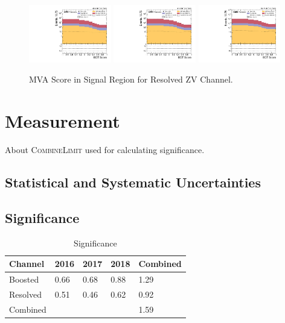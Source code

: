 \begin{figure}[!ht]
  \centering
  \includegraphics[width=0.32\textwidth]{analysis_plots/2016_zjj/sr_l/mva_score_zjj_var2_log.pdf}
  \includegraphics[width=0.32\textwidth]{analysis_plots/2017_zjj/sr_l/mva_score_zjj_var2_log.pdf}
  \includegraphics[width=0.32\textwidth]{analysis_plots/2018_zjj/sr_l/mva_score_zjj_var2_log.pdf} \\
  \caption[MVA Score in Signal Region for Resolved ZV Channel]%
  {MVA Score in Signal Region for Resolved ZV Channel.}%
  \label{fig:zjj-sr-l-mva-score}
\end{figure}

\clearpage
\section{
  Measurement
 }

About \textsc{CombineLimit}\xspace used for calculating significance.

\subsection{
  Statistical and Systematic Uncertainties
}

\subsection{
  Significance
}

\begin{table}[!ht]
  \centering
  \caption{Significance}
  \begin{tabular}{lllll}%
    \toprule
    Channel  & 2016 & 2017 & 2018 & Combined \\
    \midrule
    Boosted  & 0.66 & 0.68 & 0.88 & 1.29     \\
    Resolved & 0.51 & 0.46 & 0.62 & 0.92     \\
    \midrule
    Combined &      &      &      & 1.59     \\
    \bottomrule
  \end{tabular}\label{tab:vbs-significance}
\end{table}

